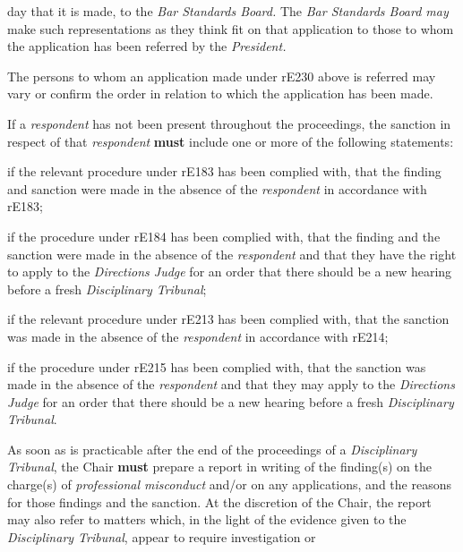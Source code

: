 day that it is made, to the \emph{Bar Standards Board. }The \emph{Bar
Standards Board may }make such representations as they think fit on that
application to those to whom the application has been referred by
the \emph{President.}\par
{}\par
The persons to whom an application made under rE230 above is referred
may vary or confirm the order in relation to which the application has
been made.\\
\par
{}
If a \emph{respondent} has not been present throughout the proceedings,
the sanction in respect of that \emph{respondent}  \textcolor{myred}{\textbf{must}} include one or
more of the following statements:\\\nl \item if the relevant procedure under rE183 has been complied with, that
the finding and sanction were made in the absence of
the \emph{respondent} in accordance with rE183;\item if the procedure under rE184 has been complied with, that the finding
and the sanction were made in the absence of the \emph{respondent} and
that they have the right to apply to the \emph{Directions Judge} for an
order that there should be a new hearing before a
fresh \emph{Disciplinary Tribunal};\item if the relevant procedure under rE213 has been complied with, that
the sanction was made in the absence of the \emph{respondent} in
accordance with rE214;\item if the procedure under rE215 has been complied with, that the
sanction was made in the absence of the \emph{respondent} and that they
may apply to the \emph{Directions Judge} for an order that there should
be a new hearing before a fresh \emph{Disciplinary Tribunal}.\ln
{}\par
{}
As soon as is practicable after the end of the proceedings of
a \emph{Disciplinary Tribunal}, the Chair  \textcolor{myred}{\textbf{must}} prepare a report in
writing of the finding(s) on the charge(s) of \emph{professional
misconduct} and/or on any applications, and the reasons for those
findings and the sanction. At the discretion of the Chair, the report
may also refer to matters which, in the light of the evidence given to
the \emph{Disciplinary Tribunal}, appear to require investigation or
